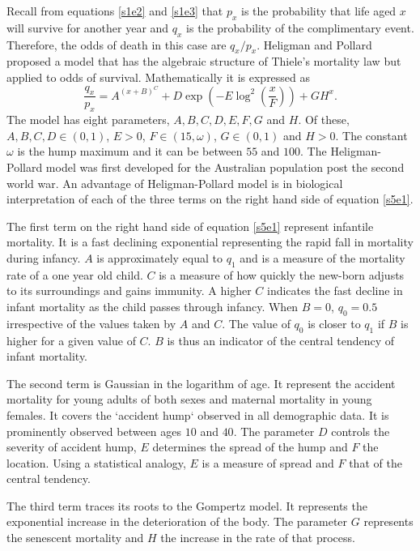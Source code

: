 \documentclass{article}
\numberwithin{equation}{section}
\begin{document}
Recall from equations \eqref{s1e2} and \eqref{s1e3} that $p_x$ is the 
probability that life aged $x$ will survive for another year and $q_x$ is
the probability of the complimentary event. Therefore, the odds of death in 
this case are $q_x/p_x$.  Heligman and Pollard \cite{heligman1980age} proposed 
a model that has the algebraic structure of Thiele's mortality law but 
applied to odds of survival. Mathematically it is expressed as
\begin{equation}\label{s5e1}
\frac{q_x}{p_x} = A^{(x+B)^C}+
D\exp\left(-E\log^2\left(\frac{x}{F}\right)\right) + GH^x.
\end{equation}
The model has eight parameters, $A, B, C, D, E, F, G$ and $H$. Of these, $A,
B, C, D \in (0, 1)$, $E > 0$, $F \in (15, \omega)$, $G \in (0, 1)$ and $H
> 0$. The constant $\omega$ is the hump maximum and it can be between $55$
and $100$. The Heligman-Pollard model was first developed for the Australian
population post the second world war. An advantage of Heligman-Pollard model 
is in biological interpretation of each of the three terms on the right hand 
side of equation \eqref{s5e1}.

The first term on the right hand side of equation \eqref{s5e1} represent 
infantile mortality. It is a fast declining exponential representing the 
rapid fall in mortality during infancy. $A$ is approximately equal to $q_1$ 
and is a measure of the mortality rate of a one year old child. $C$ is a 
measure of how quickly the new-born adjusts to its surroundings and gains 
immunity. A higher $C$ indicates the fast decline in infant mortality as the
child passes through infancy. When $B = 0$, $q_0 = 0.5$ irrespective of the
values taken by $A$ and $C$. The value of $q_0$ is closer to $q_1$ if $B$ is
higher for a given value of $C$. $B$ is thus an indicator of the central 
tendency of infant mortality. 

The second term is Gaussian in the logarithm of age. It represent the accident
mortality for young adults of both sexes and maternal mortality in young 
females. It covers the `accident hump` observed in all demographic data. It
is prominently observed between ages $10$ and $40$. The parameter $D$ controls 
the severity of accident hump, $E$ determines the spread of the hump and $F$ 
the location.  Using a statistical analogy, $E$ is a measure of spread and 
$F$ that of the central tendency. 

The third term traces its roots to the Gompertz model. It represents the
exponential increase in the deterioration of the body. The parameter $G$ 
represents the senescent mortality and $H$ the increase in the rate of that
process.
\end{document}
